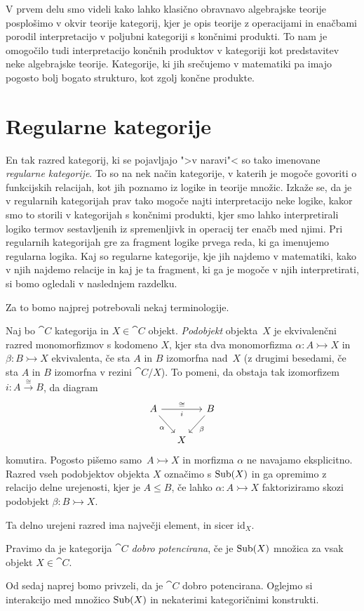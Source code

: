 \documentclass[../kategoricna_logika.tex]{subfiles}
\begin{document}
V prvem delu smo videli kako lahko klasično obravnavo algebrajske
teorije posplošimo v okvir teorije kategorij, kjer je opis teorije z
operacijami in enačbami porodil interpretacijo v poljubni kategoriji s
končnimi produkti. To nam je omogočilo tudi interpretacijo končnih
produktov v kategoriji kot predstavitev neke algebrajske
teorije. Kategorije, ki jih srečujemo v matematiki pa imajo pogosto
bolj bogato strukturo, kot zgolj končne produkte.
\section{Regularne kategorije}
En tak razred
kategorij, ki se pojavljajo ">v naravi"< so tako imenovane
\emph{regularne kategorije}.  To so na nek način kategorije, v katerih
je mogoče govoriti o funkcijskih relacijah, kot jih poznamo iz logike in teorije
množic.  Izkaže se, da je v regularnih kategorijah prav tako mogoče
najti interpretacijo neke logike, kakor smo to storili v kategorijah s
končnimi produkti, kjer smo lahko interpretirali logiko termov
sestavljenih iz spremenljivk in operacij ter enačb med njimi.  Pri
regularnih kategorijah gre za fragment logike prvega reda, ki ga
imenujemo regularna logika.  Kaj so regularne kategorije, kje jih
najdemo v matematiki, kako v njih najdemo relacije in kaj je ta
fragment, ki ga je mogoče v njih interpretirati, si bomo ogledali v
naslednjem razdelku.

Za to bomo najprej potrebovali nekaj terminologije.
\begin{definicija}
  Naj bo $\cat{C}$ kategorija in $X \in \cat{C}$ objekt.
  \emph{Podobjekt} objekta~$X$ je ekvivalenčni razred monomorfizmov s
  kodomeno $X$, kjer sta dva monomorfizma
  $\alpha: A \rightarrowtail X$ in $\beta : B \rightarrowtail X$
  ekvivalenta, če sta $A$ in $B$ izomorfna nad~$X$ (z drugimi
  besedami, če sta $A$ in $B$ izomorfna v rezini $\cat{C}/X$).  To pomeni,
  da obstaja tak izomorfizem $i : A \xrightarrow{\cong} B$, da diagram
  \begin{equation*}
    \begin{tikzcd}[column sep=small]
      A \ar[rr, "i"']{a}{\cong} \ar[dr, "\alpha"'] & & B \ar[dl, "\beta"] \\
      & X &
    \end{tikzcd}
  \end{equation*}
  komutira. Pogosto pišemo samo~${A \rightarrowtail X}$ in morfizma
  $\alpha$ ne navajamo eksplicitno.  Razred vseh podobjektov objekta
  $X$ označimo s $\operatorname{Sub}(X)$ in ga opremimo z relacijo delne urejenosti,
  kjer je $A \leq B$, če lahko $\alpha : A \rightarrowtail X$
  faktoriziramo skozi podobjekt $\beta : B \rightarrowtail X$.
\end{definicija}
Ta delno urejeni razred ima največji element, in sicer
$\mathrm{id}_X$.
\begin{definicija}
  Pravimo da je kategorija $\cat{C}$ \emph{dobro potencirana}, če je
  $\operatorname{Sub}(X)$ množica za vsak objekt $X \in \cat{C}$.
\end{definicija}
Od sedaj naprej bomo privzeli, da je $\cat{C}$ dobro potencirana.
Oglejmo si interakcijo med množico $\operatorname{Sub}(X)$ in nekaterimi
kategoričnimi konstrukti.
\end{document}
